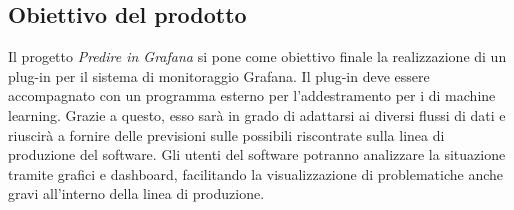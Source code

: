 \documentclass[../analisi-dei-requisiti.tex]{subfiles}
\begin{document}
\subsection{Obiettivo del prodotto}
\label{subs:obiettivo_del_prodotto}
Il progetto \emph{Predire in Grafana} si pone come obiettivo finale la realizzazione di un plug-in per il sistema di monitoraggio Grafana. Il plug-in deve essere accompagnato con un programma esterno per l'addestramento per i  di machine learning. Grazie a questo, esso sarà in grado di adattarsi ai diversi flussi di dati e riuscirà a fornire delle previsioni sulle possibili  riscontrate sulla linea di produzione del software. Gli utenti del software potranno analizzare la situazione tramite grafici e dashboard, facilitando la visualizzazione di problematiche anche gravi all'interno della linea di produzione.
\end{document}
